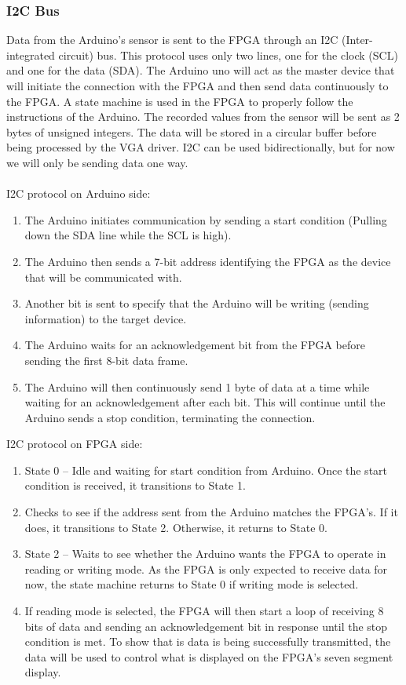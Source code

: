 \documentclass{article}
\begin{document}
\subsubsection{I2C Bus}
Data from the Arduino’s sensor is sent to the FPGA through an I2C (Inter-integrated circuit) bus. This protocol uses only two lines, one for the clock (SCL) and one for the data (SDA). The Arduino uno will act as the master device that will initiate the connection with the FPGA and then send data continuously to the FPGA. A state machine is used in the FPGA to properly follow the instructions of the Arduino. The recorded values from the sensor will be sent as 2 bytes of unsigned integers. The data will be stored in a circular buffer before being processed by the VGA driver.  I2C can be used bidirectionally, but for now we will only be sending data one way.\\\\
I2C protocol on Arduino side:\
\begin{enumerate}
    \item The Arduino initiates communication by sending a start condition (Pulling down the SDA line while the SCL is high).
    \item The Arduino then sends a 7-bit address identifying the FPGA as the device that will be communicated with.
    \item Another bit is sent to specify that the Arduino will be writing (sending information) to the target device.
    \item The Arduino waits for an acknowledgement bit from the FPGA before sending the first 8-bit data frame.
    \item The Arduino will then continuously send 1 byte of data at a time while waiting for an acknowledgement after each bit. This will continue until the Arduino sends a stop condition, terminating the connection.
\end{enumerate}
I2C protocol on FPGA side:\
\begin{enumerate}
    \item State 0 – Idle and waiting for start condition from Arduino. Once the start condition is received, it transitions to State 1.
    \item Checks to see if the address sent from the Arduino matches the FPGA’s. If it does, it transitions to State 2. Otherwise, it returns to State 0.
    \item State 2 – Waits to see whether the Arduino wants the FPGA to operate in reading or writing mode. As the FPGA is only expected to receive data for now, the state machine returns to State 0 if writing mode is selected.
    \item  If reading mode is selected, the FPGA will then start a loop of receiving 8 bits of data and sending an acknowledgement bit in response until the stop condition is met. To show that is data is being successfully transmitted, the data will be used to control what is displayed on the FPGA’s seven segment display. 
\end{enumerate}
\end{document}
